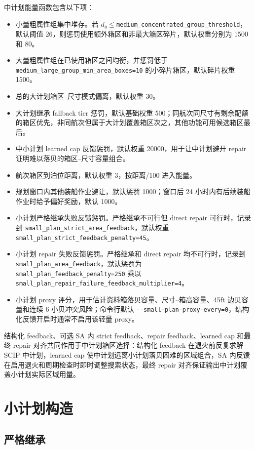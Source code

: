 \documentclass[UTF8,a4paper,11pt]{ctexart}
\newcommand{\code}[1]{\nolinkurl{#1}}
\begin{document}
中计划能量函数包含以下项：
\begin{itemize}
  \item 小量粗属性组集中堆存。若 \(d_g\le\)\code{medium_concentrated_group_threshold}，默认阈值 26，则惩罚使用额外箱区和非最大箱区碎片，默认权重分别为 1500 和 80。
  \item 大量粗属性组在已使用箱区之间均衡，并惩罚低于 \code{medium_large_group_min_area_boxes=10} 的小碎片箱区，默认碎片权重 1500。
  \item 总的大计划箱区--尺寸模式偏离，默认权重 30。
  \item 大计划继承 fallback tier 惩罚，默认基础权重 500；同航次同尺寸有剩余配额的箱区优先，非同航次但属于大计划覆盖箱区次之，其他功能可用候选箱区最后。
  \item 中小计划 learned cap 反馈惩罚，默认权重 20000，用于让中计划避开 repair 证明难以落贝的箱区--尺寸容量组合。
  \item 航次箱区到泊位距离，默认权重 3，按距离/100 进入能量。
  \item 规划窗口内其他装船作业避让，默认惩罚 1000；窗口后 24 小时内有后续装船作业时给予偏好奖励，默认 1000。
  \item 小计划严格继承失败反馈惩罚。严格继承不可行但 direct repair 可行时，记录到 \code{small_plan_strict_area_feedback}，默认权重 \code{small_plan_strict_feedback_penalty=45}。
  \item 小计划 repair 失败反馈惩罚。严格继承和 direct repair 均不可行时，记录到 \code{small_plan_area_feedback}，默认惩罚为 \code{small_plan_feedback_penalty=250} 乘以 \code{small_plan_repair_failure_feedback_multiplier=4}。
  \item 小计划 proxy 评分，用于估计资料箱落贝容量、尺寸--箱高容量、45ft 边贝容量和连续 6 小贝冲突风险；命令行默认 \code{--small-plan-proxy-every=0}，结构化反馈开启时通常不启用该轻量 proxy。
\end{itemize}

结构化 feedback、可选 SA 内 strict feedback、repair feedback、learned cap 和最终 repair 对齐共同作用于中计划箱区选择：结构化 feedback 在退火前反复求解 SCIP 中计划，learned cap 使中计划远离小计划落贝困难的区域组合，SA 内反馈在启用退火和周期检查时即时调整搜索状态，最终 repair 对齐保证输出中计划覆盖小计划实际区域用量。

\section{小计划构造}

\subsection{严格继承}
\end{document}
